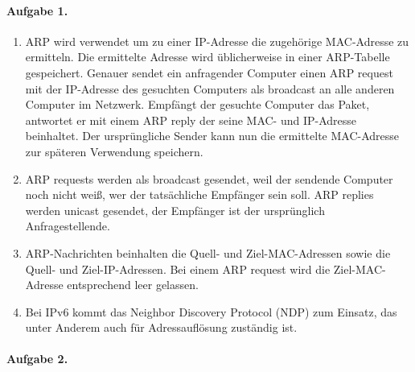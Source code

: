\documentclass{article}
\begin{document}
\paragraph{Aufgabe 1.}

\begin{enumerate}
    \item ARP wird verwendet um zu einer IP-Adresse die zugehörige MAC-Adresse zu ermitteln. Die ermittelte Adresse wird üblicherweise in einer ARP-Tabelle gespeichert. Genauer sendet ein anfragender Computer einen ARP request mit der IP-Adresse des gesuchten Computers als broadcast an alle anderen Computer im Netzwerk. Empfängt der gesuchte Computer das Paket, antwortet er mit einem ARP reply der seine MAC- und IP-Adresse beinhaltet. Der ursprüngliche Sender kann nun die ermittelte MAC-Adresse zur späteren Verwendung speichern.
    
    \item ARP requests werden als broadcast gesendet, weil der sendende Computer noch nicht weiß, wer der tatsächliche Empfänger sein soll. ARP replies werden unicast gesendet, der Empfänger ist der ursprünglich Anfragestellende.
    
    \item ARP-Nachrichten beinhalten die Quell- und Ziel-MAC-Adressen sowie die Quell- und Ziel-IP-Adressen. Bei einem ARP request wird die Ziel-MAC-Adresse entsprechend leer gelassen.
    
    \item Bei IPv6 kommt das Neighbor Discovery Protocol (NDP) zum Einsatz, das unter Anderem auch für Adressauflösung zuständig ist.
\end{enumerate}

\paragraph{Aufgabe 2.}
\end{document}
